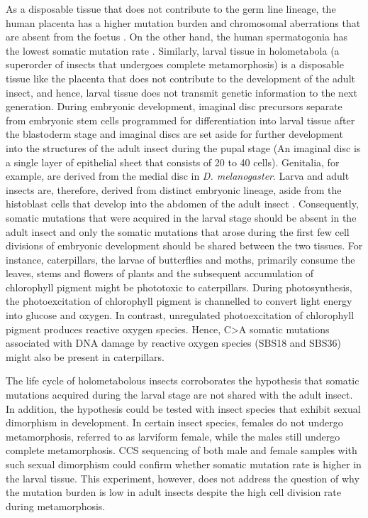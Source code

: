 As a disposable tissue that does not contribute to the germ line lineage, the human placenta has a higher mutation burden and chromosomal aberrations that are absent from the foetus \cite{}. On the other hand, the human spermatogonia has the lowest somatic mutation rate \cite{}. Similarly, larval tissue in holometabola (a superorder of insects that undergoes complete metamorphosis) is a disposable tissue like the placenta that does not contribute to the development of the adult insect, and hence, larval tissue does not transmit genetic information to the next generation. During embryonic development, imaginal disc precursors separate from embryonic stem cells programmed for differentiation into larval tissue after the blastoderm stage and imaginal discs are set aside for further development into the structures of the adult insect during the pupal stage (An imaginal disc is a single layer of epithelial sheet that consists of 20 to 40 cells). Genitalia, for example, are derived from the medial disc in \textit{D. melanogaster}. Larva and adult insects are, therefore, derived from distinct embryonic lineage, aside from the histoblast cells that develop into the abdomen of the adult insect \cite{}. Consequently, somatic mutations that were acquired in the larval stage should be absent in the adult insect and only the somatic mutations that arose during the first few cell divisions of embryonic development should be shared between the two tissues. For instance, caterpillars, the larvae of butterflies and moths, primarily consume the leaves, stems and flowers of plants and the subsequent accumulation of chlorophyll pigment might be phototoxic to caterpillars. During photosynthesis, the photoexcitation of chlorophyll pigment is channelled to convert light energy into glucose and oxygen. In contrast, unregulated photoexcitation of chlorophyll pigment produces reactive oxygen species. Hence, C>A somatic mutations associated with DNA damage by reactive oxygen species (SBS18 and SBS36) might also be present in caterpillars. 

The life cycle of holometabolous insects corroborates the hypothesis that somatic mutations acquired during the larval stage are not shared with the adult insect. In addition, the hypothesis could be tested with insect species that exhibit sexual dimorphism in development. In certain insect species, females do not undergo metamorphosis, referred to as larviform female, while the males still undergo complete metamorphosis. CCS sequencing of both male and female samples with such sexual dimorphism could confirm whether somatic mutation rate is higher in the larval tissue. This experiment, however, does not address the question of why the mutation burden is low in adult insects despite the high cell division rate during metamorphosis. 

